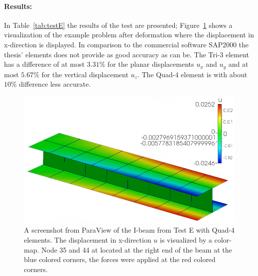  \paragraph{Results:} In Table~\ref{tab:testE} the results of the test are presented; Figure~\ref{fig:testEimg} shows a visualization of the example problem after deformation where the displacement in x-direction is displayed. In comparison to the commercial software SAP2000 the thesis' elements does not provide as good accuracy as can be. The Tri-3 element has a difference of at most $3.31\%$ for the planar displacements $u_x$ and $u_y$ and at most $5.67\%$ for the vertical displacement $u_z$. The Quad-4 element is with about $10\%$ difference less accurate.
 \begin{figure}[htbp]
 	\centering
 	\includegraphics[width=0.75\linewidth]{figures/i-beam}
 	\caption{A screenshot from ParaView of the I-beam from Test E with Quad-4 elements. The displacement in x-direction $u$ is visualized by a color-map. Node 35 and 44 at located at the right end of the beam at the blue colored corners, the forces were applied at the red colored corners.}
 	\label{fig:testEimg}
 \end{figure}
